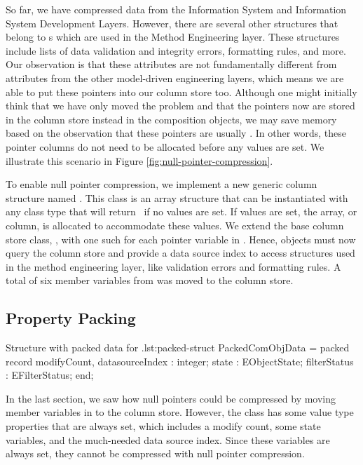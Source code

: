 
So far, we have compressed data from the Information System and Information System Development Layers. However, there are several other structures that belong to s which are used in the Method Engineering layer. These structures include lists of data validation and integrity errors, formatting rules, and more. Our observation is that these attributes are not fundamentally different from attributes from the other model-driven engineering layers, which means we are able to put these pointers into our column store too. Although one might initially think that we have only moved the problem and that the pointers now are stored in the column store instead in the composition objects, we may save memory based on the observation that these pointers are usually \nil. In other words, these pointer columns do not need to be allocated before any values are set. We illustrate this scenario in Figure \ref{fig:null-pointer-compression}.

To enable null pointer compression, we implement a new generic column structure named . This class is an array structure that can be instantiated with any class type that will return \nil~if no values are set. If values are set, the array, or column, is allocated to accommodate these values. We extend the base column store class, , with one such  for each pointer variable in . Hence, objects must now query the column store and provide a data source index to access structures used in the method engineering layer, like validation errors and formatting rules. A total of six member variables from  was moved to the column store.

\subsection{Property Packing}
\label{sub:Property Packing}
\begin{delphicode}{Structure with packed data for .}{lst:packed-struct}
PackedComObjData = packed record
    modifyCount,
    datasourceIndex    : integer; 
    state              : EObjectState;
    filterStatus       : EFilterStatus;
end;
\end{delphicode}
In the last section, we saw how null pointers could be compressed by moving member variables in  to the column store. However, the  class has some value type properties that are always set, which includes a modify count, some state variables, and the much-needed data source index. Since these variables are always set, they cannot be compressed with null pointer compression.

